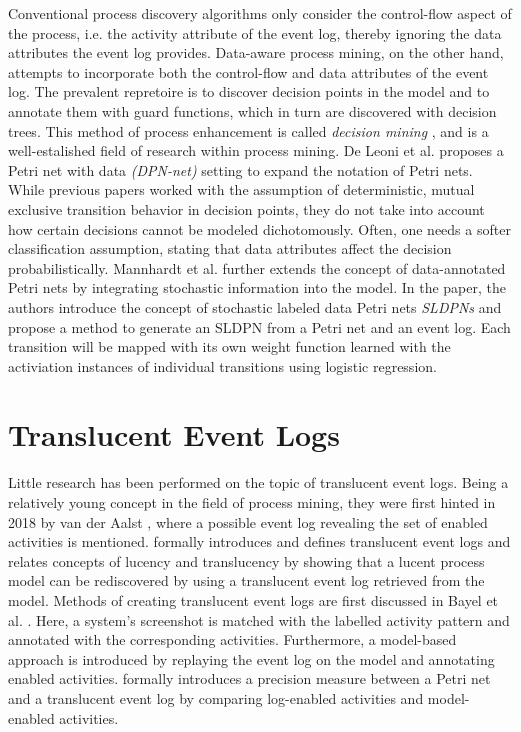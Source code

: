 Conventional process discovery algorithms only consider the control-flow aspect of the process, i.e. the activity attribute of the event log, thereby ignoring the data attributes the event log provides. Data-aware process mining, on the other hand, attempts to incorporate both the control-flow and data attributes of the event log. The prevalent repretoire is to discover decision points in the model and to annotate them with guard functions, which in turn are discovered with decision trees. This method of process enhancement is called \emph{decision mining} \cite{decision-mining-in-prom,decision-mining-in-business-processes,data-aware-process-mining}, and is a well-estalished field of research within process mining. De Leoni et al. \cite{data-aware-process-mining} proposes a Petri net with data \emph{(DPN-net)} setting to expand the notation of Petri nets. While previous papers worked with the assumption of deterministic, mutual exclusive transition behavior in decision points, they do not take into account how certain decisions cannot be modeled dichotomously. Often, one needs a softer classification assumption, stating that data attributes affect the decision probabilistically. Mannhardt et al. \cite{sldpn} further extends the concept of data-annotated Petri nets by integrating stochastic information into the model. In the paper, the authors introduce the concept of stochastic labeled data Petri nets \emph{SLDPNs} and propose a method to generate an SLDPN from a Petri net and an event log. Each transition will be mapped with its own weight function learned with the activiation instances of individual transitions using logistic regression.

\section{Translucent Event Logs}

Little research has been performed on the topic of translucent event logs. Being a relatively young concept in the field of process mining, they were first hinted in 2018 by van der Aalst \cite{lucency-first-paper}, where a possible event log revealing the set of enabled activities is mentioned. \cite{Translucent-event-logs-first-paper} formally introduces and defines translucent event logs and relates concepts of lucency and translucency by showing that a lucent process model can be rediscovered by using a translucent event log retrieved from the model. Methods of creating translucent event logs are first discussed in Bayel et al. \cite{creating-translucent-event-logs}. Here, a system's screenshot is matched with the labelled activity pattern and annotated with the corresponding activities. Furthermore, a model-based approach is introduced by replaying the event log on the model and annotating enabled activities. \cite{translucent-precision} formally introduces a precision measure between a Petri net and a translucent event log by comparing log-enabled activities and model-enabled activities.

